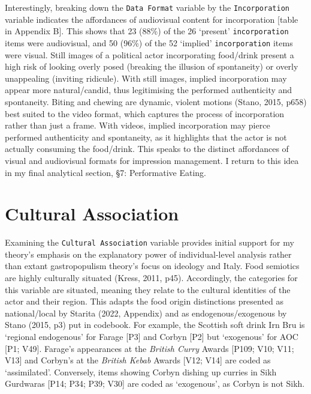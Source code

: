 \documentclass[a4paper, nobind]{templates/ociamthesis}
\begin{document}
Interestingly, breaking down the \texttt{Data\ Format} variable by the \texttt{Incorporation} variable indicates the affordances of audiovisual content for incorporation {{[}table in Appendix B{]}}. This shows that 23 (88\%) of the 26 `present' \texttt{incorporation} items were audiovisual, and 50 (96\%) of the 52 `implied' \texttt{incorporation} items were visual. Still images of a political actor incorporating food/drink present a high risk of looking overly posed (breaking the illusion of spontaneity) or overly unappealing (inviting ridicule). With still images, implied incorporation may appear more natural/candid, thus legitimising the performed authenticity and spontaneity. Biting and chewing are dynamic, violent motions (Stano, 2015, p658) best suited to the video format, which captures the process of incorporation rather than just a frame. With videos, implied incorporation may pierce performed authenticity and spontaneity, as it highlights that the actor is not actually consuming the food/drink. This speaks to the distinct affordances of visual and audiovisual formats for impression management.
I return to this idea in my final analytical section, §7: Performative Eating.

\hypertarget{cultural-association}{%
\section*{Cultural Association}\label{cultural-association}}

Examining the \texttt{Cultural\ Association} variable provides initial support for my theory's emphasis on the explanatory power of individual-level analysis rather than extant gastropopulism theory's focus on ideology and Italy.
Food semiotics are highly culturally situated (Kress, 2011, p45). Accordingly, the categories for this variable are situated, meaning they relate to the cultural identities of the actor and their region. This adapts the food origin distinctions presented as national/local by Starita (2022, Appendix) and as endogenous/exogenous by Stano (2015, p3) {put in codebook}. For example, the Scottish soft drink Irn Bru is `regional endogenous' for Farage {[}P3{]} and Corbyn {[}P2{]} but `exogenous' for AOC {[}P1; V49{]}. Farage's appearances at the \emph{British Curry} Awards {[}P109; V10; V11; V13{]} and Corbyn's at the \emph{British Kebab} Awards {[}V12; V14{]} are coded as `assimilated'. Conversely, items showing Corbyn dishing up curries in Sikh Gurdwaras {[}P14; P34; P39; V30{]} are coded as `exogenous', as Corbyn is not Sikh.
\end{document}
